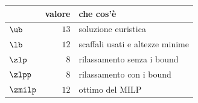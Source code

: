 \begin{center}\small
\begin{tabular}{lrl}
\toprule
 & valore & che cos'è \\
\midrule
$\ub$ & $13$ & soluzione euristica \\
$\lb$ & $12$ & scaffali usati e altezze minime \\
$\zlp$ & $8$ & rilassamento senza i bound \\
$\zlpp$ & $8$ & rilassamento con i bound \\
$\zmilp$ & $12$ & ottimo del MILP \\
\bottomrule
\end{tabular}
\end{center}
